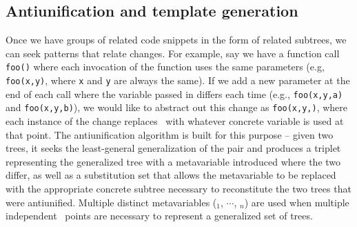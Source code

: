 \subsection{Antiunification and template generation}

Once we have groups of related code snippets in the form of related subtrees,
we can seek patterns that relate changes.  For example, say we have a function
call {\tt foo()} where each invocation of the function uses the same
parameters (e.g, {\tt foo(x,y)}, where {\tt x} and {\tt y} are always the
same). If we add a new parameter at the end of each call where the variable
passed in differs each time (e.g., {\tt foo(x,y,a)} and {\tt foo(x,y,b)}), we
would like to abstract out this change as {\tt foo(x,y,\metavar)}, where each
instance of the change replaces \metavar~with whatever concrete variable is
used at that point. The antiunification algorithm is built for this purpose --
given two trees, it seeks the least-general generalization of the pair and
produces a triplet representing the generalized tree with a metavariable
introduced where the two differ, as well as a substitution set that allows the
metavariable to be replaced with the appropriate concrete subtree necessary to
reconstitute the two trees that were antiunified.  Multiple distinct
metavariables (\metavar$_1$, $\cdots$, \metavar$_n$) are used when multiple
independent \metavar~points are necessary to represent a generalized set of
trees.
